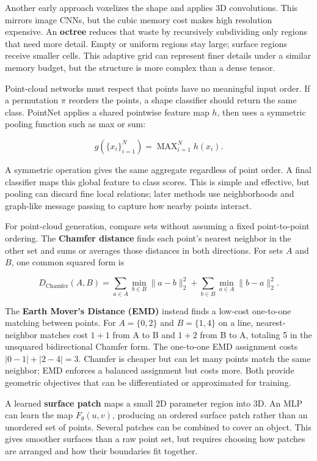 Another early approach voxelizes the shape and applies 3D convolutions. This mirrors image CNNs, but the cubic memory cost makes high resolution expensive. An \textbf{octree} reduces that waste by recursively subdividing only regions that need more detail. Empty or uniform regions stay large; surface regions receive smaller cells. This adaptive grid can represent finer details under a similar memory budget, but the structure is more complex than a dense tensor.

Point-cloud networks must respect that points have no meaningful input order. If a permutation \(\pi\) reorders the points, a shape classifier should return the same class. PointNet applies a shared pointwise feature map \(h\), then uses a symmetric pooling function such as max or sum:

\[
g(\{x_i\}_{i=1}^{N})=\operatorname{MAX}_{i=1}^{N}h(x_i).
\]

A symmetric operation gives the same aggregate regardless of point order. A final classifier maps this global feature to class scores. This is simple and effective, but pooling can discard fine local relations; later methods use neighborhoods and graph-like message passing to capture how nearby points interact.

For point-cloud generation, compare sets without assuming a fixed point-to-point ordering. The \textbf{Chamfer distance} finds each point's nearest neighbor in the other set and sums or averages those distances in both directions. For sets \(A\) and \(B\), one common squared form is

\[
D_{\text{Chamfer}}(A,B)=\sum_{a\in A}\min_{b\in B}\|a-b\|_2^2+
\sum_{b\in B}\min_{a\in A}\|b-a\|_2^2.
\]

The \textbf{Earth Mover's Distance (EMD)} instead finds a low-cost one-to-one matching between points. For \(A=\{0,2\}\) and \(B=\{1,4\}\) on a line, nearest-neighbor matches cost \(1+1\) from A to B and \(1+2\) from B to A, totaling 5 in the unsquared bidirectional Chamfer form. The one-to-one EMD assignment costs \(|0-1|+|2-4|=3\). Chamfer is cheaper but can let many points match the same neighbor; EMD enforces a balanced assignment but costs more. Both provide geometric objectives that can be differentiated or approximated for training.

A learned \textbf{surface patch} maps a small 2D parameter region into 3D. An MLP can learn the map \(F_\theta(u,v)\), producing an ordered surface patch rather than an unordered set of points. Several patches can be combined to cover an object. This gives smoother surfaces than a raw point set, but requires choosing how patches are arranged and how their boundaries fit together.

